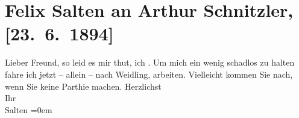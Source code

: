 

         
         \renewcommand{\erwaehntePersonen}{Personen: Felix Salten}
         \renewcommand{\erwaehnteOrte}{Orte: Weidling, Wien}
         \renewcommand{\erwaehnteWerke}{}
               \section[Felix Salten an Arthur Schnitzler, {[}23. 6. 1894{]}]{ Felix Salten an Arthur Schnitzler, {[}23. 6. 1894{]}}\nopagebreak{}\rehead{ }\begin{ledgroupsized}[t]{13cm}\normalsize\beginnumbering \toendnotes[C]{\smallbreak\pagebreak[2]} 
\toendnotes[C]{\smallbreak}\pstart
           \noindent{}{\pb}Lieber Freund, so leid es mir thut, ich \label{K_L03137-1v}\label{K_L03137-1h}. Um mich ein wenig schadlos zu halten fahre ich jetzt – allein – nach Weidling, arbeiten. Vielleicht kommen Sie nach,
               wenn Sie {\pb}keine Parthie
               machen.\pend
           \pstart
           Herzlichst {\\[\baselineskip]}Ihr {\\[\baselineskip]}\spacefill\mbox{Salten}\pend
           \leftskip=0em{}
         
         \endnumbering{}\end{ledgroupsized}  \newcommand{\dateiname}{L03137}\newcommand{\titel}{Felix Salten an Arthur Schnitzler, [23. 6. 1894]}\newcommand{\editorInnen}{Martin Anton Müller und Laura Untner}
      